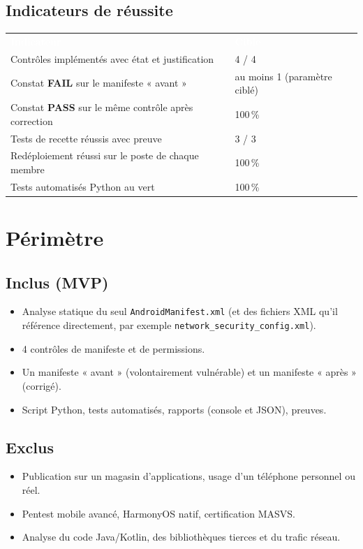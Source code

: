 \documentclass[11pt,a4paper]{article}
\newcommand{\code}[1]{{\NoAutoSpacing\texttt{\small #1}}}
\newcommand{\code}[1]{{\texttt{\small #1}}}
\newcommand{\PASS}{\textbf{\textcolor{vert}{PASS}}}
\newcommand{\FAIL}{\textbf{\textcolor{rouge}{FAIL}}}
\newcommand{\hd}[1]{\textcolor{white}{\textbf{#1}}}
\begin{document}
\subsection{Indicateurs de réussite}
\begin{center}
\begin{tabular}{L{9.2cm}L{5.4cm}}
\hd{Indicateur} & \hd{Cible}\\
Contrôles implémentés avec état et justification & 4 / 4\\
Constat \FAIL{} sur le manifeste « avant » & au moins 1 (paramètre ciblé)\\
Constat \PASS{} sur le même contrôle après correction & 100\,\%\\
Tests de recette réussis avec preuve & 3 / 3\\
Redéploiement réussi sur le poste de chaque membre & 100\,\%\\
Tests automatisés Python au vert & 100\,\%\\
\end{tabular}
\end{center}

\section{Périmètre}

\subsection{Inclus (MVP)}
\begin{itemize}
  \item Analyse statique du seul \code{AndroidManifest.xml} (et des fichiers XML qu'il référence directement, par exemple \code{network\_security\_config.xml}).
  \item 4 contrôles de manifeste et de permissions.
  \item Un manifeste « avant » (volontairement vulnérable) et un manifeste « après » (corrigé).
  \item Script Python, tests automatisés, rapports (console et JSON), preuves.
\end{itemize}

\subsection{Exclus}
\begin{itemize}
  \item Publication sur un magasin d'applications, usage d'un téléphone personnel ou réel.
  \item Pentest mobile avancé, HarmonyOS natif, certification MASVS.
  \item Analyse du code Java/Kotlin, des bibliothèques tierces et du trafic réseau.
\end{itemize}
\end{document}
